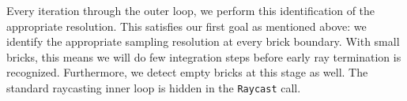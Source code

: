 

Every iteration through the outer loop, we perform this identification
of the appropriate resolution.  This satisfies our first goal as
mentioned above: we identify the appropriate sampling resolution
at every brick boundary.  With small bricks, this means we will do
few integration steps before early ray termination is recognized.
Furthermore, we detect empty bricks at this stage as well.  The
standard
raycasting inner loop is hidden in the \texttt{Raycast} call.


